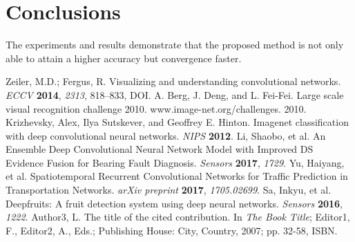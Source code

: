 \documentclass[sensors,article,submit,moreauthors,pdftex,10pt,a4paper]{mdpi}
\begin{document}
\section{Conclusions}

The experiments and results demonstrate that the proposed method is not only able to attain a higher accuracy but convergence faster.

\begin{thebibliography}{999}
Zeiler, M.D.; Fergus, R. Visualizing and understanding convolutional networks. {\em ECCV} {\bf 2014}, {\em 2313}, 818--833, DOI.
A. Berg, J. Deng, and L. Fei-Fei. Large scale visual recognition challenge 2010. www.image-net.org/challenges. 2010.
Krizhevsky, Alex, Ilya Sutskever, and Geoffrey E. Hinton. Imagenet classification with deep convolutional neural networks. {\em NIPS} {\bf 2012}.
Li, Shaobo, et al. An Ensemble Deep Convolutional Neural Network Model with Improved DS Evidence Fusion for Bearing Fault Diagnosis. {\em Sensors} {\bf 2017}, {\em 1729}.
Yu, Haiyang, et al. Spatiotemporal Recurrent Convolutional Networks for Traffic Prediction in Transportation Networks. {\em arXiv preprint} {\bf 2017}, {\em 1705.02699}.
Sa, Inkyu, et al. Deepfruits: A fruit detection system using deep neural networks. {\em Sensors} {\bf 2016}, {\em 1222}.
Author3, L. The title of the cited contribution. In {\em The Book Title}; Editor1, F., Editor2, A., Eds.; Publishing House: City, Country, 2007; pp. 32-58, ISBN.
\end{thebibliography}


%


\end{document}
